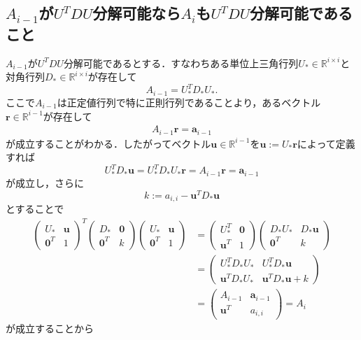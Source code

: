 \documentclass{jsarticle}
\theoremstyle{definition}
\theoremstyle{mystyle} %
\begin{document}
\subsection*{\Large $A_{i-1}$が$U^TDU$分解可能なら$A_i$も$U^TDU$分解可能であること}
$A_{i-1}$が$U^TDU$分解可能であるとする．すなわちある単位上三角行列$U_{\ast}\in \mathbb{R}^{i\times i}$と対角行列$D_{\ast}\in \mathbb{R}^{i\times i}$が存在して
$$A_{i-1}=U_{\ast}^TD_{\ast}U_{\ast}.$$
ここで$A_{i-1}$は正定値行列で特に正則行列であることより，あるベクトル${\bm r}\in \mathbb{R}^{i-1}$が存在して
\begin{align*}
A_{i-1}{\bm r}={\bm a}_{i-1}
\end{align*}
が成立することがわかる．したがってベクトル${\bm u}\in \mathbb{R}^{i-1}$を${\bm u}:=U_{\ast}{\bm r}$によって定義すれば
$$U_{\ast}^T D_{\ast}{\bm u}=U_{\ast}^T D_{\ast}U_{\ast}{\bm r}=A_{i-1}{\bm r}={\bm a}_{i-1}$$
が成立し，さらに
$$k:=a_{i,i}-{\bm u}^TD_{\ast} {\bm u}$$
とすることで
\begin{align*}
\begin{pmatrix}
U_{\ast}  & {\bm u}\\
{\bm 0}^T  & 1
\end{pmatrix}^T \begin{pmatrix}
D_{\ast} &{\bm 0}\\
{\bm 0}^T & k
\end{pmatrix}\begin{pmatrix}
U_{\ast}  & {\bm u}\\
{\bm 0}^T  & 1
\end{pmatrix}&=\begin{pmatrix}
U_{\ast}^T  & {\bm 0}\\
{\bm u}^T  & 1
\end{pmatrix}\begin{pmatrix}
D_{\ast}U_{\ast} & D_{\ast}{\bm u}\\
{\bm 0}^T & k
\end{pmatrix}\\
&=\begin{pmatrix}
U_{\ast}^TD_{\ast}U_{\ast} & U_{\ast}^TD_{\ast}{\bm u}\\
{\bm u}^TD_{\ast}U_{\ast} & {\bm u}^TD_{\ast}{\bm u}+k
\end{pmatrix}\\
&=\begin{pmatrix}
A_{i-1} & {\bm a}_{i-1}\\
{\bm u}^T & a_{i,i}
\end{pmatrix} = A_i
\end{align*}
が成立することから
\end{document}
